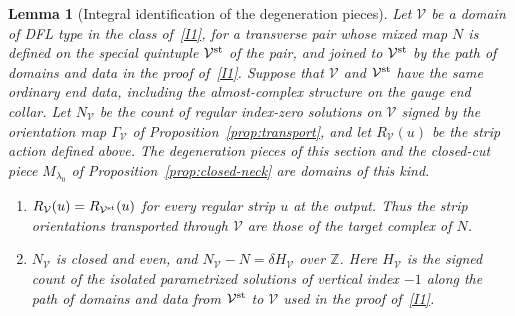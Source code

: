 \documentclass[11pt]{amsart}
\newtheorem{lemma}[theorem]{Lemma}
\theoremstyle{definition}
\theoremstyle{remark}
\theoremstyle{plain}
\numberwithin{equation}{section}
\newcommand{\ZZ}{\mathbb Z}
\begin{document}
\begin{lemma}[Integral identification of the degeneration pieces]\label{lem:vertex-id}
Let $\mathcal V$ be a domain of DFL type in the class of~\ref{I1}, for a
transverse pair whose mixed map $N$ is defined on the special quintuple
$\mathcal V^{\rm st}$ of the pair, and joined to $\mathcal V^{\rm st}$ by the
path of domains and data in the proof of~\ref{I1}. Suppose that
$\mathcal V$ and $\mathcal V^{\rm st}$ have the same ordinary end data,
including the almost-complex structure on the gauge end collar. Let
$N_{\mathcal V}$ be the count of regular index-zero solutions on
$\mathcal V$ signed by the orientation map $\Gamma_{\mathcal V}$ of
Proposition~\ref{prop:transport}, and let $R_{\mathcal V}(u)$ be the strip
action defined above. The degeneration pieces of this section and the
closed-cut piece $M_{\lambda_0}$ of Proposition~\ref{prop:closed-neck} are
domains of this kind.
\begin{enumerate}[label=(V\arabic*)]
\item $R_{\mathcal V}(u)=R_{\mathcal V^{\rm st}}(u)$ for every regular
strip $u$ at the output. Thus the strip orientations transported through
$\mathcal V$ are those of the target complex of $N$.
\item $N_{\mathcal V}$ is closed and even, and
$N_{\mathcal V}-N=\delta H_{\mathcal V}$ over $\ZZ$. Here
$H_{\mathcal V}$ is the signed count of the isolated parametrized
solutions of vertical index $-1$ along the path of domains and data from
$\mathcal V^{\rm st}$ to $\mathcal V$ used in the proof of~\ref{I1}.
\end{enumerate}
\end{lemma}
\end{document}
